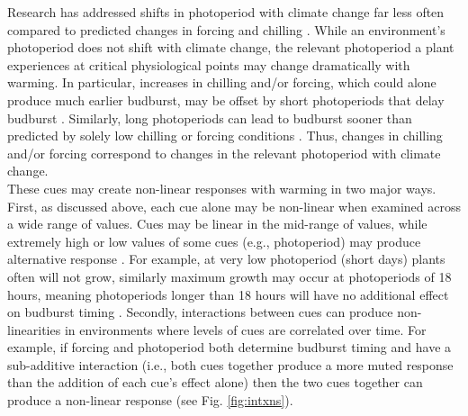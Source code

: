 \documentclass[11pt,letter]{article}
\begin{document}
Research has addressed shifts in photoperiod with climate change far less often compared to predicted changes in forcing and chilling \citep[but see][]{saikkonen2012,way2015}. While an environment's photoperiod does not shift with climate change, the relevant photoperiod a plant experiences at critical physiological points may change dramatically with warming. In particular, increases in chilling and/or forcing, which could alone produce much earlier budburst, may be offset by short photoperiods that delay budburst \citep{gauzere2019}. Similarly, long photoperiods can lead to budburst sooner than predicted by solely low chilling or forcing conditions \citep{Nienstaedt:1966aa,Myking:1995,Partanen:1998aa}. Thus, changes in chilling and/or forcing correspond to changes in the relevant photoperiod with climate change. \\

These cues may create non-linear responses with warming in two major ways. First, as discussed above, each cue alone may be non-linear when examined across a wide range of values. Cues may be linear in the mid-range of values, while extremely high or low values of some cues (e.g., photoperiod) may produce alternative response \citep{gauzere2017}. For example, at very low photoperiod (short days) plants often will not grow, similarly maximum growth may occur at photoperiods of 18 hours, meaning photoperiods longer than 18 hours will have no additional effect on budburst timing \citep{major1980}. Secondly, interactions between cues can produce non-linearities in environments where levels of cues are correlated over time. For example, if forcing and photoperiod both determine budburst timing and have a sub-additive interaction (i.e., both cues together produce a more muted response than the addition of each cue's effect alone) then the two cues together can produce a non-linear response (see Fig. \ref{fig:intxns}). \\ %
\end{document}
